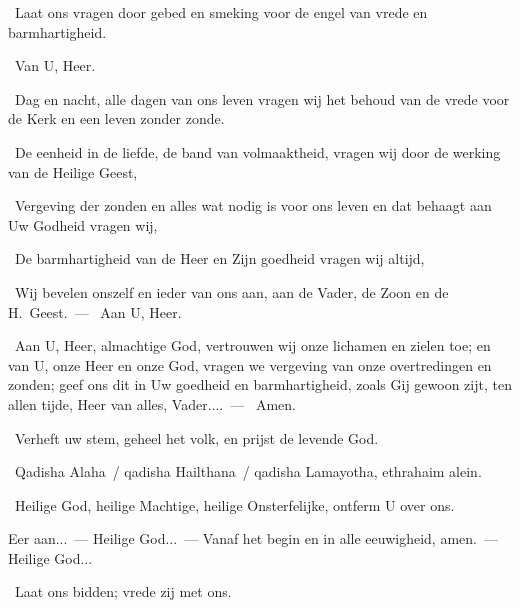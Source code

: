 \documentclass[12pt,twoside,a5paper]{article}
\begin{document}


\begin{halfparskip}
  \dd~Laat ons vragen door gebed en smeking voor de engel van vrede en barmhartigheid.

  \rr~Van U, Heer. 

  \dd~Dag en nacht, alle dagen van ons leven vragen wij het behoud van de vrede voor de Kerk en een leven zonder zonde.

  \dd~De eenheid in de liefde, de band van volmaaktheid, vragen wij door de werking van de Heilige Geest,

  \dd~Vergeving der zonden en alles wat nodig is voor ons leven en dat behaagt aan Uw Godheid vragen wij,

  \dd~De barmhartigheid van de Heer en Zijn goedheid vragen wij altijd,

  \dd~Wij bevelen onszelf en ieder van ons aan, aan de Vader, de Zoon en de H.~Geest.~--- \rr~Aan U, Heer.

  \cc~Aan U, Heer, almachtige God, vertrouwen wij onze lichamen en zielen toe; en van U, onze Heer en onze God, vragen we vergeving van onze overtredingen en zonden; geef ons dit in Uw goedheid en barmhartigheid, zoals Gij gewoon zijt, ten allen tijde, Heer van alles, Vader....~--- \rr~Amen.
\end{halfparskip}



\dd~Verheft uw stem, geheel het volk, en prijst de levende God.

\vspace{\parskip}
\begin{doublecols}
  \fontsize{11}{12}\selectfont

  \dutchl \rr~Qadisha Alaha~/ qadisha Hailthana~/ qadisha Lamayotha, ethrahaim alein.

   \rr~Heilige God, heilige Machtige, heilige Onsterfelijke, ontferm U over ons.
\end{doublecols}

\begin{halfparskip}
  Eer aan...~--- Heilige God...~--- Vanaf het begin en in alle eeuwigheid, amen.~--- Heilige God...

  \dd~Laat ons bidden; vrede zij met ons.
\end{halfparskip}
\end{document}
